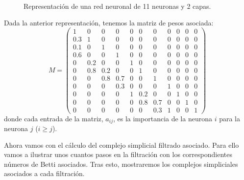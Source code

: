 \documentclass[12pt, a4paper, twoside]{book}
\numberwithin{equation}{section}
\theoremstyle{definition}
\newenvironment{ejem}
  {\pushQED{\qed}\renewcommand{\qedsymbol}{$\blacktriangleleft$}\ejemplo}
  {\popQED\endejemplo}
\theoremstyle{remark}
\theoremstyle{plain}
\begin{document}
\begin{ejem}
\begin{figure}[H]
				\caption{Representación de una red neuronal de 11 neuronas y 2 capas.}
				\label{fig:ejemGlobal}
		\end{figure}
		Dada la anterior representación, tenemos la matriz de pesos 
		asociada:
		\begin{equation*}
			M=\begin{pmatrix}
				1 & 0 & 0 & 0 & 0 & 0 & 0 & 0 & 0 & 0 & 0 \\
				0.3 & 1 & 0 & 0 & 0 & 0 & 0 & 0 & 0 & 0 & 0 \\
				0.1 & 0 & 1 & 0 & 0 & 0 & 0 & 0 & 0 & 0 & 0 \\
				0.6 & 0 & 0 & 1 & 0 & 0 & 0 & 0 & 0 & 0 & 0 \\
				0 & 0.2 & 0 & 0 & 1 & 0 & 0 & 0 & 0 & 0 & 0 \\
				0 & 0.8 & 0.2 & 0 & 0 & 1 & 0 & 0 & 0 & 0 & 0 \\
				0 & 0 & 0.8 & 0.7 & 0 & 0 & 1 & 0 & 0 & 0 & 0 \\
				0 & 0 & 0 & 0.3 & 0 & 0 & 0 & 1 & 0 & 0 & 0 \\
				0 & 0 & 0 & 0 & 1 & 0.2 & 0 & 0 & 1 & 0 & 0 \\
				0 & 0 & 0 & 0 & 0 & 0.8 & 0.7 & 0 & 0 & 1 & 0 \\
				0 & 0 & 0 & 0 & 0 & 0 & 0.3 & 1 & 0 & 0 & 1 
			\end{pmatrix}
		\end{equation*}
		donde cada entrada de la matriz, $a_{ij}$, es la importancia 
		de la neurona $i$ para la neurona $j$ ($i \geq j$).

		Ahora vamos con el cálculo del complejo simplicial filtrado 
		asociado. Para ello vamos a ilustrar unos cuantos pasos en la 
		filtración con los correspondientes números de Betti 
		asociados. Tras esto, mostraremos los complejos
		simpliciales asociados a cada filtración.


\end{ejem}
\end{document}
